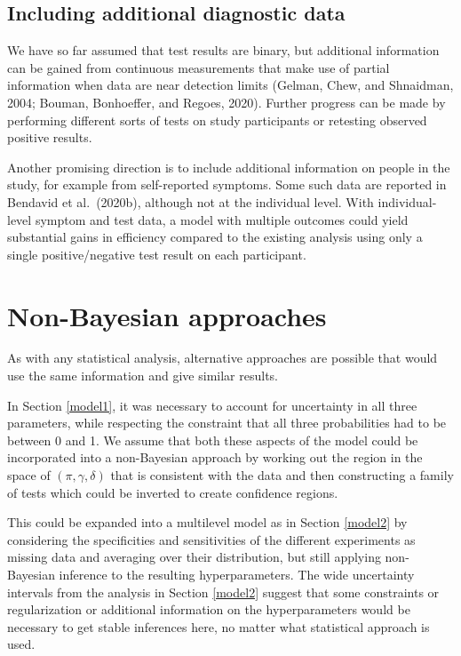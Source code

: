 \documentclass[11pt]{article}
\begin{document}
\subsection{Including additional diagnostic data}
We have so far assumed that test results are binary, but additional information can be gained from continuous measurements that make use of partial information when data are near detection limits (Gelman, Chew, and Shnaidman, 2004; Bouman, Bonhoeffer, and Regoes, 2020).  Further progress can be made by performing different sorts of tests on study participants or retesting observed positive results.

Another promising direction is to include additional information on people in the study, for example from self-reported symptoms.  Some such data are reported in Bendavid et al.\ (2020b), although not at the individual level. With individual-level symptom and test data, a model with multiple outcomes could yield substantial gains in efficiency compared to the existing analysis using only a single positive/negative test result on each participant.

\section{Non-Bayesian approaches}\label{nonbayes}
As with any statistical analysis, alternative approaches are possible that would use the same information and  give similar results.

In Section \ref{model1}, it was necessary to account for uncertainty in all three parameters, while respecting the constraint that all three probabilities had to be between 0 and 1.  We assume that both these aspects of the model could be incorporated into a non-Bayesian approach by working out the region in the space of $(\pi,\gamma,\delta)$ that is consistent with the data and then constructing a family of tests which could be inverted to create confidence regions.

This could be expanded into a multilevel model as in Section \ref{model2} by considering the specificities and sensitivities of the different experiments as missing data and averaging over their distribution, but still applying non-Bayesian inference to the resulting hyperparameters.  The wide uncertainty intervals from the analysis in Section \ref{model2} suggest that some constraints or regularization or additional information on the hyperparameters would be necessary to get stable inferences here, no matter what statistical approach is used.
\end{document}

